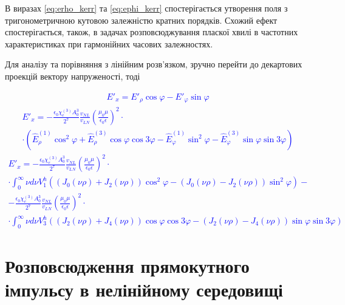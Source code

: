 В виразах \eqref{eq:erho_kerr} та \eqref{eq:ephi_kerr} спостерігається
утворення поля з тригонометричною кутовою залежністю кратних порядків.
Схожий ефект спостерігається, також, в задачах розповсюджування пласкої 
хвилі в частотних характеристиках при гармонійних часових залежностях.


Для аналізу та порівняння з лінійним розв'язком, зручно перейти до 
декартових проекцій вектору напруженості, тоді

\textcolor{blue} { \begin{equation*} \begin{aligned}
E'_x = E'_\rho \cos \varphi - E'_\varphi \sin \varphi
\end{aligned} \end{equation*} }
%
\textcolor{blue} { \begin{equation*} \begin{aligned}
E'_x = - \frac{\epsilon_0 \chi_e^{(3)} A_0^3}{2^7} \frac{v_{NL}}{v_{LN}}
\left( \frac{\mu_0 \mu}{\epsilon_0 \epsilon} \right)^2 \cdot \\ \cdot
\left(\hat{E}_\rho^{(1)} \cos^2 \varphi +
\hat{E}_\rho^{(3)} \cos \varphi \cos 3 \varphi - 
\hat{E}_\varphi^{(1)} \sin^2 \varphi -
\hat{E}_\varphi^{(3)} \sin \varphi \sin 3 \varphi \right)
\end{aligned} \end{equation*} }
%
\textcolor{blue} { \begin{equation*} \begin{aligned}
E'_x = - \frac{\epsilon_0 \chi_e^{(3)} A_0^3}{2^7} \frac{v_{NL}}{v_{LN}}
\left( \frac{\mu_0 \mu}{\epsilon_0 \epsilon} \right)^2 \cdot \\ \cdot
\int_0^\infty \nu d \nu V_1^h \left( 
\left( J_0 (\nu \rho) + J_2 (\nu \rho) \right) \cos^2 \varphi -
\left( J_0 (\nu \rho) - J_2 (\nu \rho) \right) \sin^2 \varphi \right) - \\
- \frac{\epsilon_0 \chi_e^{(3)} A_0^3}{2^7} \frac{v_{NL}}{v_{LN}}
\left( \frac{\mu_0 \mu}{\epsilon_0 \epsilon} \right)^2 \cdot \\ \cdot
\int_0^\infty \nu d \nu V_3^h \left( 
\left( J_2 (\nu \rho) + J_4 (\nu \rho) \right) \cos \varphi \cos 3 \varphi -
\left( J_2 (\nu \rho) - J_4 (\nu \rho) \right) \sin \varphi \sin 3 \varphi 
\right)
\end{aligned} \end{equation*} }



\section{Розповсюдження прямокутного імпульсу в нелінійному середовищі}

